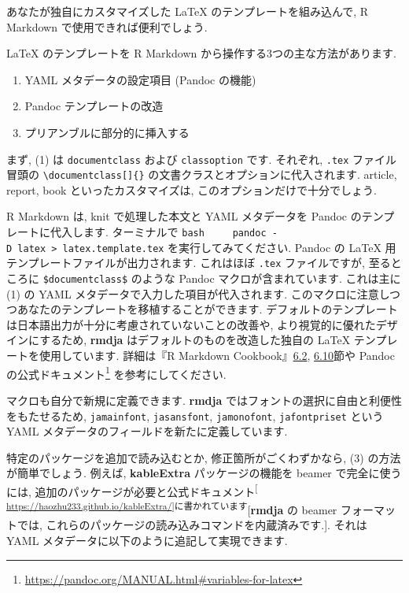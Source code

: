 \documentclass[
]{ltjsarticle}
\providecommand{\tightlist}{%
  \setlength{\itemsep}{0pt}\setlength{\parskip}{0pt}}
\begin{document}
あなたが独自にカスタマイズした LaTeX のテンプレートを組み込んで, R Markdown で使用できれば便利でしょう.

LaTeX のテンプレートを R Markdown から操作する3つの主な方法があります.

\begin{enumerate}
\def\labelenumi{\arabic{enumi}.}
\tightlist
\item
  YAML メタデータの設定項目 (Pandoc の機能)
\item
  Pandoc テンプレートの改造
\item
  プリアンブルに部分的に挿入する
\end{enumerate}

まず, (1) は \texttt{documentclass} および \texttt{classoption} です. それぞれ, \texttt{.tex} ファイル冒頭の \texttt{\textbackslash{}documentclass{[}{]}\{\}} の文書クラスとオプションに代入されます. article, report, book といったカスタマイズは, このオプションだけで十分でしょう.

R Markdown は, knit で処理した本文と YAML メタデータを Pandoc のテンプレートに代入します. ターミナルで
\texttt{bash\ \ \ \ \ pandoc\ -D\ latex\ \textgreater{}\ latex.template.tex}
を実行してみてください. Pandoc の LaTeX 用テンプレートファイルが出力されます. これはほぼ \texttt{.tex} ファイルですが, 至るところに \texttt{\$documentclass\$} のような Pandoc マクロが含まれています. これは主に (1) の YAML メタデータで入力した項目が代入されます. このマクロに注意しつつあなたのテンプレートを移植することができます. デフォルトのテンプレートは日本語出力が十分に考慮されていないことの改善や, より視覚的に優れたデザインにするため, \textbf{rmdja} はデフォルトのものを改造した独自の LaTeX テンプレートを使用しています. 詳細は『R Markdown Cookbook』\href{https://gedevan-aleksizde.github.io/rmarkdown-cookbook/latex-variables.html}{6.2}, \href{https://gedevan-aleksizde.github.io/rmarkdown-cookbook/latex-template.html}{6.10}節や Pandoc の公式ドキュメント\footnote{ \url{https://pandoc.org/MANUAL.html\#variables-for-latex}} を参考にしてください.

マクロも自分で新規に定義できます. \textbf{rmdja} ではフォントの選択に自由と利便性をもたせるため, \texttt{jamainfont}, \texttt{jasansfont}, \texttt{jamonofont}, \texttt{jafontpriset} という YAML メタデータのフィールドを新たに定義しています.

特定のパッケージを追加で読み込むとか, 修正箇所がごくわずかなら, (3) の方法が簡単でしょう. 例えば, \textbf{kableExtra} パッケージの機能を beamer で完全に使うには, 追加のパッケージが必要と公式ドキュメント\textsuperscript{{[} \url{https://haozhu233.github.io/kableExtra/}{]}に書かれています}{[}\textbf{rmdja} の beamer フォーマットでは, これらのパッケージの読み込みコマンドを内蔵済みです.{]}. それは YAML メタデータに以下のように追記して実現できます.
\end{document}
